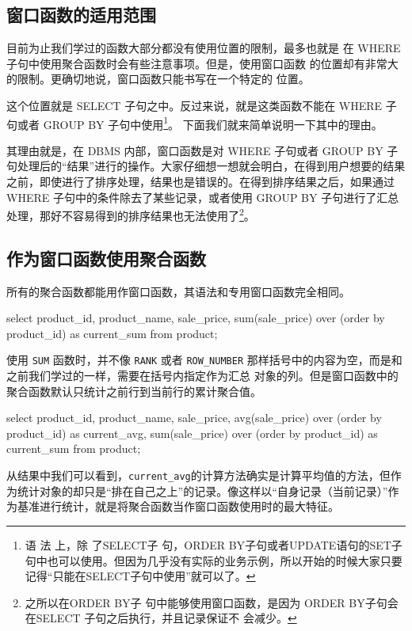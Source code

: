 \subsection{窗口函数的适用范围}
目前为止我们学过的函数大部分都没有使用位置的限制，最多也就是
在 WHERE 子句中使用聚合函数时会有些注意事项。但是，使用窗口函数
的位置却有非常大的限制。更确切地说，窗口函数只能书写在一个特定的
位置。

这个位置就是 SELECT 子句之中。反过来说，就是这类函数不能在
WHERE 子句或者 GROUP BY 子句中使用\footnote{语 法 上，除 了SELECT子 句，ORDER BY子句或者UPDATE语句的SET子句中也可以使用。但因为几乎没有实际的业务示例，所以开始的时候大家只要记得“只能在SELECT子句中使用”就可以了。}。
下面我们就来简单说明一下其中的理由。

其理由就是，在 DBMS 内部，窗口函数是对 WHERE 子句或者 GROUP BY 子句处理后的“结果”进行的操作。大家仔细想一想就会明白，在得到用户想要的结果之前，即使进行了排序处理，结果也是错误的。在得到排序结果之后，如果通过 WHERE 子句中的条件除去了某些记录，或者使用 GROUP BY 子句进行了汇总处理，那好不容易得到的排序结果也无法使用了\footnote{之所以在ORDER BY子
句中能够使用窗口函数，是因为
ORDER BY子句会在SELECT
子句之后执行，并且记录保证不
会减少。}。
\subsection{作为窗口函数使用聚合函数}
所有的聚合函数都能用作窗口函数，其语法和专用窗口函数完全相同。

\begin{sqlc}
select product_id, product_name, sale_price,
	sum(sale_price) over (order by product_id) as current_sum
	from product;
\end{sqlc}

使用 \verb|SUM| 函数时，并不像 \verb|RANK| 或者 \verb|ROW_NUMBER| 那样括号中的内容为空，而是和之前我们学过的一样，需要在括号内指定作为汇总
对象的列。但是窗口函数中的聚合函数默认只统计之前行到当前行的累计聚合值。

\begin{sqlc}
select product_id, product_name, sale_price,
	avg(sale_price) over (order by product_id) as current_avg,
	sum(sale_price) over (order by product_id) as current_sum
	from product;
\end{sqlc}

从结果中我们可以看到，\verb|current_avg|的计算方法确实是计算平均值的方法，但作为统计对象的却只是“排在自己之上”的记录。像这样以“自身记录（当前记录）”作为基准进行统计，就是将聚合函数当作窗口函数使用时的最大特征。


